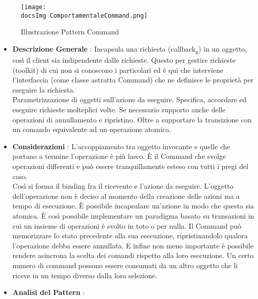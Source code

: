 {{{			\begin{figure}[H]
				\centering
				\texttt{[image: \\docsImg ComportamentaleCommand.png]}
				\caption{Illustrazione Pattern Command}
				\label{Illustrazione Pattern Command}
			\end{figure}
		
			\begin{itemize}\itemsep1pt
				\item \textbf{Descrizione Generale} :  Incapsula una richiesta (callback\textsubscript{g}) in un oggetto, così il client sia indipendente dalle richieste. Questo per gestire richieste (toolkit) di cui non si conoscono i particolari ed è qui che interviene l'interfaccia (come classe astratta Command) che ne definisce le proprietà per eseguire la richiesta.\\
				Parametrizzazione di oggetti sull'azione da eseguire. Specifica, accordare ed eseguire richieste molteplici volte. Se necessario supporto anche delle operazioni di annullamento e ripristino. Oltre a supportare la transizione con un comando equivalente ad un operazione atomica.
				\item \textbf{Considerazioni} : L'accoppiamento tra oggetto invocante e quelle che portano a termine l'operazione è più lasco. È il Command che svolge operazioni differenti e può essere tranquillamente esteso con tutti i pregi del caso.\\
				Così si forma il binding  fra il ricevente e l'azione da eseguire. L'oggetto dell'operazione non è deciso al momento della creazione delle azioni ma a tempo di esecuzione. È possibile incapsulare un'azione in modo che questa sia atomica. È così possibile implementare un paradigma basato su transazioni in cui un insieme di operazioni è svolto in toto o per nulla. Il Command può memorizzare lo stato precedente alla sua esecuzione, ripristinandolo qualora l'operazione debba essere annullata. E infine non meno importante è possibile rendere asincrona la scelta dei comandi rispetto alla loro esecuzione. Un certo numero di command possono essere consumati da un altro oggetto che li riceve in un tempo diverso dalla loro selezione.
				\item \textbf{Analisi del Pattern} : \hfill
				

\end{itemize}}}}

